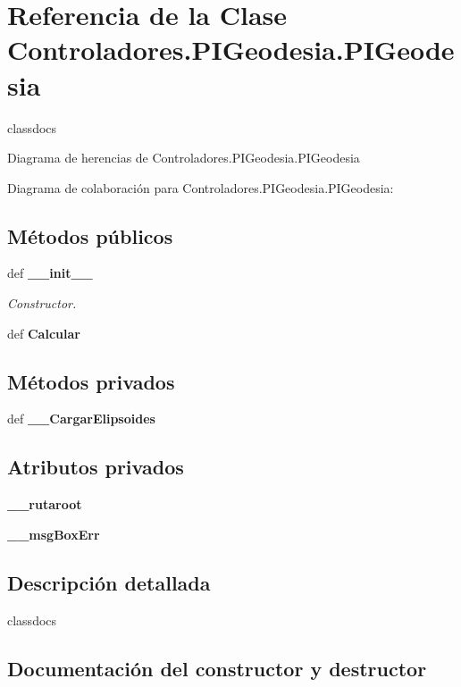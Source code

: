 \section{Referencia de la Clase Controladores.\-P\-I\-Geodesia.\-P\-I\-Geodesia}
\label{classControladores_1_1PIGeodesia_1_1PIGeodesia}


classdocs  




Diagrama de herencias de Controladores.\-P\-I\-Geodesia.\-P\-I\-Geodesia


Diagrama de colaboración para Controladores.\-P\-I\-Geodesia.\-P\-I\-Geodesia\-:
\subsection*{Métodos públicos}
\begin{DoxyCompactItemize}
\item 
def {\bf \-\_\-\-\_\-init\-\_\-\-\_\-}
\begin{DoxyCompactList}\small\item\em Constructor. \end{DoxyCompactList}\item 
def {\bf Calcular}
\end{DoxyCompactItemize}
\subsection*{Métodos privados}
\begin{DoxyCompactItemize}
\item 
def {\bf \-\_\-\-\_\-\-Cargar\-Elipsoides}
\end{DoxyCompactItemize}
\subsection*{Atributos privados}
\begin{DoxyCompactItemize}
\item 
{\bf \-\_\-\-\_\-rutaroot}
\item 
{\bf \-\_\-\-\_\-msg\-Box\-Err}
\end{DoxyCompactItemize}


\subsection{Descripción detallada}
classdocs 

\subsection{Documentación del constructor y destructor}
